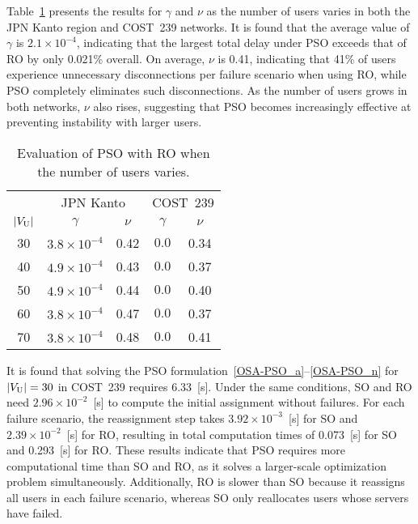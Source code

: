 \documentclass[10pt, letterpaper]{IEEEtran}
\begin{document}
\begin{CJK}{UTF8}{ipxm}
Table~\ref{tab:OSA-PSO_gamma_nu} presents the results for $\gamma$ and $\nu$ as the number of users varies in both the JPN Kanto region and COST~239 networks.
It is found that the average value of $\gamma$ is $2.1 \times 10^{-4}$, indicating that the largest total delay under PSO exceeds that of RO by only 0.021\% overall.
On average, $\nu$ is 0.41, indicating that 41\% of users experience unnecessary disconnections per failure scenario when using RO, while PSO completely eliminates such disconnections.
As the number of users grows in both networks, $\nu$ also rises, suggesting that PSO becomes increasingly effective at preventing instability with larger users.
\begin{table}[t]
  \caption{Evaluation of PSO with RO when the number of users varies.}
  \label{tab:OSA-PSO_gamma_nu}
  \begin{center}
    \begin{tabular}{c|cc|cc}
      \hline
      & \multicolumn{2}{c|}{JPN Kanto} & \multicolumn{2}{c}{COST~239} \\ \cline{2-5}
      $|V_{\rm{U}}|$ & $\gamma$ & $\nu$ & $\gamma$ & $\nu$ \\
      \hline
      30 & $3.8 \times 10^{-4}$ & 0.42 & $0.0$ & 0.34 \\
      40 & $4.9 \times 10^{-4}$ & 0.43 & $0.0$ & 0.37 \\
      50 & $4.9 \times 10^{-4}$ & 0.44 & $0.0$ & 0.40 \\
      60 & $3.8 \times 10^{-4}$ & 0.47 & $0.0$ & 0.37 \\
      70 & $3.8 \times 10^{-4}$ & 0.48 & $0.0$ & 0.41 \\
      \hline
    \end{tabular}
  \end{center}
\end{table}

It is found that solving the PSO formulation~\eqref{OSA-PSO_a}--\eqref{OSA-PSO_n} for $|V_{\rm U}|=30$ in COST~239 requires 6.33~[s].
Under the same conditions, SO and RO need $2.96 \times 10^{-2}$~[s] to compute the initial assignment without failures.
For each failure scenario, the reassignment step takes $3.92 \times 10^{-3}$~[s] for SO and $2.39 \times 10^{-2}$~[s] for RO, resulting in total computation times of 0.073~[s] for SO and 0.293~[s] for RO.
These results indicate that PSO requires more computational time than SO and RO, as it solves a larger-scale optimization problem simultaneously.
Additionally, RO is slower than SO because it reassigns all users in each failure scenario, whereas SO only reallocates users whose servers have failed.


\end{CJK}
\end{document}
